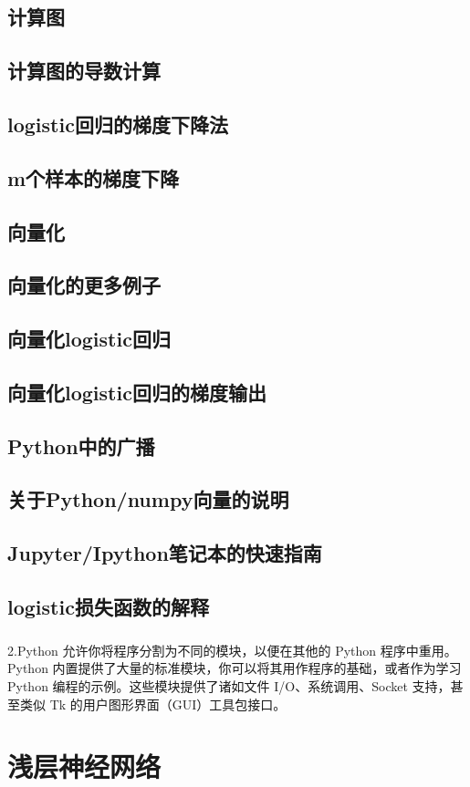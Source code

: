 \documentclass{article}
\begin{document}
\begin{CJK}{UTF8}{gbsn}
\subsection{计算图}
\subsection{计算图的导数计算}
\subsection{logistic回归的梯度下降法}
\subsection{m个样本的梯度下降}
\subsection{向量化}
\subsection{向量化的更多例子}
\subsection{向量化logistic回归}
\subsection{向量化logistic回归的梯度输出}
\subsection{Python中的广播}
\subsection{关于Python/numpy向量的说明}
\subsection{Jupyter/Ipython笔记本的快速指南}
\subsection{logistic损失函数的解释}
\subparagraph*{}
2.Python 允许你将程序分割为不同的模块，以便在其他的 Python 程序中重用。Python 内置提供了大量的标准模块，你可以将其用作程序的基础，或者作为学习 Python 编程的示例。这些模块提供了诸如文件 I/O、系统调用、Socket 支持，甚至类似 Tk 的用户图形界面（GUI）工具包接口。
\section{浅层神经网络}

\end{CJK}
\end{document}
